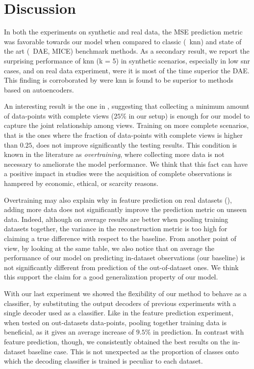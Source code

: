 \section{Discussion}

In both the experiments on synthetic and real data, the MSE prediction metric was favorable towards our model when compared to classic (\eg\ knn) and state of the art (\eg\ DAE, MICE) benchmark methods.
As a secondary result, we report the surprising performance of knn (k = 5) in synthetic scenarios, especially in low snr cases, and on real data experiment, were it is most of the time superior the DAE.
This finding is corroborated by \cite{Platias2020} were knn is found to be superior to methods based on autoencoders.

An interesting result is the one in , suggesting that collecting a minimum amount of data-points with complete views ($25\%$ in our setup) is enough for our model to capture the joint relationship among views.
Training on more complete scenarios, that is the ones where the fraction of data-points with complete views is higher than $0.25$, does not improve significantly the testing results.
This condition is known in the literature as \textit{overtraining}, where collecting more data is not necessary to ameliorate the model performance.
We think that this fact can have a positive impact in studies were the acquisition of complete observations is hampered by economic, ethical, or scarcity reasons.

Overtraining may also explain why in feature prediction on real datasets (), adding more data does not significantly improve the prediction metric on unseen data.
Indeed, although on average results are better when pooling training datasets together, the variance in the reconstruction metric is too high for claiming a true difference with respect to the baseline.
From another point of view, by looking at the same table, we also notice that on average the performance of our model on predicting in-dataset observations (our baseline) is not significantly different from prediction of the out-of-dataset ones.
We think this support the claim for a good generalization property of our model.

With our last experiment we showed the flexibility of our method to behave as a classifier, by substituting the output decoders of previous experiments with a single decoder used as a classifier.
Like in the feature prediction experiment, when tested on out-datasets data-points, pooling together training data is beneficial, as it gives an average increase of $9.5\%$ in  prediction.
In contrast with feature prediction, though, we consistently obtained the best results on the in-dataset baseline case.
This is not unexpected as the proportion of classes onto which the decoding classifier is trained is peculiar to each dataset.

